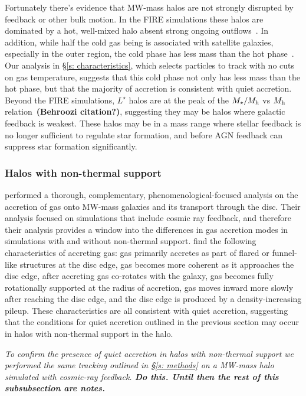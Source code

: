 \documentclass[fleqn,usenatbib]{mnras}
\begin{document}
Fortunately there's evidence that MW-mass halos are not strongly disrupted by feedback or other bulk motion.
In the FIRE simulations these halos are dominated by a hot, well-mixed halo absent strong ongoing outflows~\citep{Hafen2019}.
In addition, while half the cold gas being is associated with satellite galaxies, especially in the outer region, the cold phase has less mass than the hot phase~\citep{Hafen2020}.
Our analysis in \S\ref{s: characteristics}, which selects particles to track with no cuts on gas temperature, suggests that this cold phase not only has less mass than the hot phase, but that the majority of accretion is consistent with quiet accretion.
Beyond the FIRE simulations, $L^\star$ halos are at the peak of the $M_\star/M_{\rm h}$ vs $M_{\rm h}$ relation~\textbf{(Behroozi citation?)}, suggesting they may be halos where galactic feedback is weakest.
These halos may be in a mass range where stellar feedback is no longer sufficient to regulate star formation, and before AGN feedback can suppress star formation significantly.

\subsubsection{Halos with non-thermal support}
\label{s: broader prevalance -- non-thermal}

\cite{Trapp2021} performed a thorough, complementary, phenomenological-focused analysis on the accretion of gas onto MW-mass galaxies and its transport through the disc.
Their analysis focused on simulations that include cosmic ray feedback, and therefore their analysis provides a window into the differences in gas accretion modes in simulations with and without non-thermal support.
\citeauthor{Trapp2021} find the following characteristics of accreting gas:
gas primarily accretes as part of flared or funnel-like structures at the disc edge,
gas becomes more coherent as it approaches the disc edge,
after accreting gas co-rotates with the galaxy,
gas becomes fully rotationally supported at the radius of accretion,
gas moves inward more slowly after reaching the disc edge,
and the disc edge is produced by a density-increasing pileup.
These characteristics are all consistent with quiet accretion, suggesting that the conditions for quiet accretion outlined in the previous section may occur in halos with non-thermal support in the halo.

\textit{
To confirm the presence of quiet accretion in halos with non-thermal support we performed the same tracking outlined in \S\ref{s: methods} on a MW-mass halo simulated with cosmic-ray feedback.
\textbf{Do this. Until then the rest of this subsubsection are notes.}
}
\end{document}
